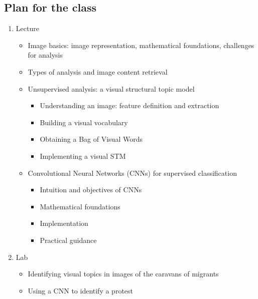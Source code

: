 \documentclass[11pt]{article}
\begin{document}
\begin{flushleft}
\section{Plan for the class}
\begin{enumerate}
	\item Lecture
	\begin{itemize}
		\item Image basics: image representation, mathematical foundations, challenges for analysis
		\item Types of analysis and image content retrieval
		\item Unsupervised analysis: a visual structural topic model
		\begin{itemize}
			\item Understanding an image: feature definition and extraction
			\item Building a visual vocabulary
			\item Obtaining a Bag of Visual Words
			\item Implementing a visual STM
		\end{itemize}
		\item Convolutional Neural Networks (CNNs) for supervised classification
		\begin{itemize}
			\item Intuition and objectives of CNNs
			\item Mathematical foundations
			\item Implementation
			\item Practical guidance
		\end{itemize}
	\end{itemize}
	\item Lab
	\begin{itemize}
		\item Identifying visual topics in images of the caravans of migrants
		\item Using a CNN to identify a protest
	\end{itemize}
\end{enumerate}

\end{flushleft}
\end{document}
